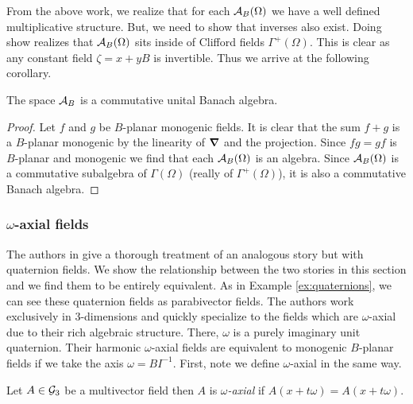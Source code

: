 From the above work, we realize that for each $\mathcal{A}_{B}(\Omega)$ we have a well defined multiplicative structure. But, we need to show that inverses also exist. Doing show realizes that $\mathcal{A}_{B}(\Omega)$ sits inside of Clifford fields $\Gamma^+(\Omega)$. This is clear as any constant field $\zeta = x+yB$ is invertible. Thus we arrive at the following corollary.
\begin{corollary}
The space $\mathcal{A}_{B}$ is a commutative unital Banach algebra.
\end{corollary}
\begin{proof}
Let $f$ and $g$ be $B$-planar monogenic fields. It is clear that the sum $f+g$ is a $B$-planar monogenic by the linearity of $\boldsymbol{\nabla}$ and the projection. Since $fg=gf$ is $B$-planar and monogenic we find that each $\mathcal{A}_{B}(\Omega)$ is an algebra. Since $\mathcal{A}_{B}(\Omega)$ is a commutative subalgebra of $\Gamma(\Omega)$ (really of $\Gamma^+(\Omega)$), it is also a commutative Banach algebra.
\end{proof}

\subsubsection{$\omega$-axial fields}
The authors in \cite{belishev_algebraic_2019,belishev_algebras_2019} give a thorough treatment of an analogous story but with quaternion fields.  We show the relationship between the two stories in this section and we find them to be entirely equivalent. As in Example \ref{ex:quaternions}, we can see these quaternion fields as parabivector fields.  The authors work exclusively in 3-dimensions and quickly specialize to the fields which are $\omega$-axial due to their rich algebraic structure. There, $\omega$ is a purely imaginary unit quaternion. Their harmonic $\omega$-axial fields are equivalent to monogenic $B$-planar fields if we take the axis $\omega = BI^{-1}$. First, note we define $\omega$-axial in the same way.
\begin{definition}
    Let $A \in \mathcal{G}_3$ be a multivector field then $A$ is \emph{$\omega$-axial} if $A(x+t\omega) = A(x+t\omega)$.  
\end{definition}

